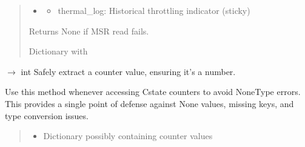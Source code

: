 \documentclass[letterpaper,10pt,english]{sphinxmanual}
\begin{document}
\begin{fulllineitems}
\begin{fulllineitems}
\begin{description}
\end{description}
\begin{quote}\begin{description}
\sphinxAtStartPar
\begin{itemize}
\item {} \begin{description}
\begin{itemize}
\item {} 
\sphinxAtStartPar
thermal\_log: Historical throttling indicator (sticky)

\end{itemize}

\end{description}

\end{itemize}

\sphinxAtStartPar
Returns None if MSR read fails.


\sphinxAtStartPar
Dictionary with

\end{description}\end{quote}

\end{fulllineitems}


\begin{fulllineitems}
\label{\detokenize{core.readers.msr_reader:core.readers.msr_reader.MSRReader.safe_get_counter}}
\pysigstartsignatures
\pysiglinewithargsret
{}
{\sphinxparamcomma {}\sphinxparamcomma {}}
{{ $\rightarrow$ int}}
\pysigstopsignatures
\sphinxAtStartPar
Safely extract a counter value, ensuring it’s a number.

\sphinxAtStartPar
Use this method whenever accessing C\sphinxhyphen{}state counters to avoid NoneType errors.
This provides a single point of defense against None values, missing keys,
and type conversion issues.
\begin{quote}\begin{description}
\begin{itemize}
\item {} 
\sphinxAtStartPar
{} \textendash{} Dictionary possibly containing counter values


\end{itemize}
\end{description}
\end{quote}
\end{fulllineitems}
\end{fulllineitems}
\end{document}
